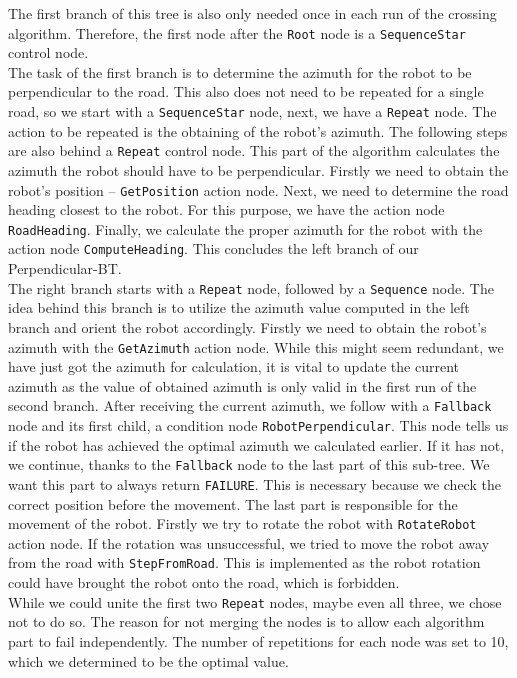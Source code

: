     The first branch of this tree is also only needed once in each run of the crossing algorithm. Therefore, the first node after the \texttt{Root} node is a \texttt{SequenceStar} control node.\\
    The task of the first branch is to determine the azimuth for the robot to be perpendicular to the road. This also does not need to be repeated for a single road, so we start with a \texttt{SequenceStar} node, next, we have a \texttt{Repeat} node. The action to be repeated is the obtaining of the robot's azimuth. The following steps are also behind a \texttt{Repeat} control node. This part of the algorithm calculates the azimuth the robot should have to be perpendicular. Firstly we need to obtain the robot's position -- \texttt{GetPosition} action node. Next, we need to determine the road heading closest to the robot. For this purpose, we have the action node \texttt{RoadHeading}. Finally, we calculate the proper azimuth for the robot with the action node \texttt{ComputeHeading}. This concludes the left branch of our Perpendicular-BT.\\
    The right branch starts with a \texttt{Repeat} node, followed by a \texttt{Sequence} node. The idea behind this branch is to utilize the azimuth value computed in the left branch and orient the robot accordingly. Firstly we need to obtain the robot's azimuth with the \texttt{GetAzimuth} action node. While this might seem redundant, we have just got the azimuth for calculation, it is vital to update the current azimuth as the value of obtained azimuth is only valid in the first run of the second branch. After receiving the current azimuth, we follow with a \texttt{Fallback} node and its first child, a condition node \texttt{RobotPerpendicular}. This node tells us if the robot has achieved the optimal azimuth we calculated earlier. If it has not, we continue, thanks to the \texttt{Fallback} node to the last part of this sub-tree. We want this part to always return \texttt{FAILURE}. This is necessary because we check the correct position before the movement. The last part is responsible for the movement of the robot. Firstly we try to rotate the robot with \texttt{RotateRobot} action node. If the rotation was unsuccessful, we tried to move the robot away from the road with \texttt{StepFromRoad}. This is implemented as the robot rotation could have brought the robot onto the road, which is forbidden.\\
    While we could unite the first two \texttt{Repeat} nodes, maybe even all three, we chose not to do so. The reason for not merging the nodes is to allow each algorithm part to fail independently. The number of repetitions for each node was set to 10, which we determined to be the optimal value.

